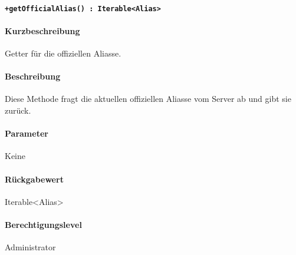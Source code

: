 \paragraph{\texttt{+getOfficialAlias() : Iterable<Alias>}}%
\paragraph*{Kurzbeschreibung}
Getter für die offiziellen Aliasse.
\paragraph*{Beschreibung}
Diese Methode fragt die aktuellen offiziellen Aliasse vom Server ab und gibt sie zurück.
\paragraph*{Parameter}
Keine
\paragraph*{Rückgabewert}
Iterable<Alias>
\paragraph*{Berechtigungslevel}
Administrator